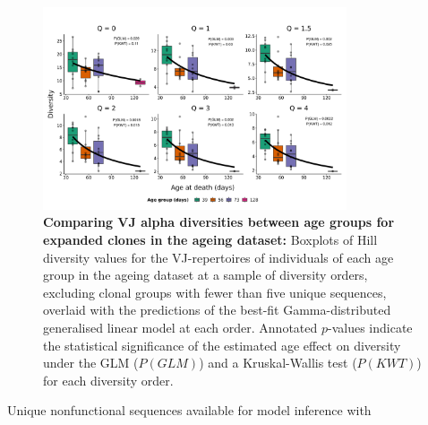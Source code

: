 \begin{figure}
\centering
\includegraphics[width = 0.8\textwidth]{_Figures/png/ageing-VJ-diversity-vlarge-solo-fit-gamma}
\caption[Comparing VJ alpha diversities between age groups for large clones in the \igseq ageing dataset]{\textbf{Comparing VJ alpha diversities between age groups for expanded clones in the \igseq ageing dataset:} Boxplots of Hill diversity values for the VJ-repertoires of individuals of each age group in the \igseq ageing dataset at a sample of diversity orders, excluding clonal groups with fewer than five unique sequences, overlaid with the predictions of the best-fit Gamma-distributed generalised linear model at each order.  Annotated $p$-values indicate the statistical significance of the estimated age effect on diversity under the GLM ($P(GLM)$) and a Kruskal-Wallis test ($P(KWT)$) for each diversity order.}
\label{fig:igseq-ageing-VJ-diversity-large-solo-fit-gamma}
\end{figure}

\begin{table}
\caption{Unique nonfunctional sequences available for model inference with }\label{tab:igseq-ageing-igor-seqs}

\end{table}

